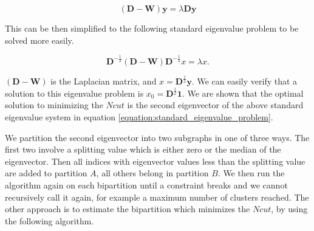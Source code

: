 \documentclass[11pt,openany]{book}
\begin{document}
\begin{equation}
    (\mathbf{D} - \mathbf{W}) \mathbf{y} = \lambda \mathbf{D} \mathbf{y}
    \label{equation:general_eigenvalue_problem}
\end{equation}

This can be then simplified to the following standard eigenvalue problem to be solved more easily.

\begin{equation}
    \mathbf{D}^{-\frac{1}{2}} (\mathbf{D} - \mathbf{W}) \mathbf{D}^{-\frac{1}{2}}  x = \lambda x.
    \label{equation:standard_eigenvalue_problem}
\end{equation}

$(\mathbf{D} - \mathbf{W})$ is the Laplacian matrix, and $x = \mathbf{D}^{\frac{1}{2}} \mathbf{y}$. We can easily verify that a solution to this eigenvalue problem is $x_0 = \mathbf{D}^{\frac{1}{2}} \mathbf{1}$. We are shown that the optimal solution to minimizing the $Ncut$ is the second eigenvector of the above standard eigenvalue system in equation \ref{equation:standard_eigenvalue_problem}.

We partition the second eigenvector into two subgraphs in one of three ways. The first two involve a splitting value which is either zero or the median of the eigenvector. Then all indices with eigenvector values less than the splitting value are added to partition $A$, all others belong in partition $B$. We then run the algorithm again on each bipartition until a constraint breaks and we cannot recursively call it again, for example a maximum number of clusters reached. The other approach is to estimate the bipartition which minimizes the $Ncut$, by using the following algorithm. 
\end{document}
